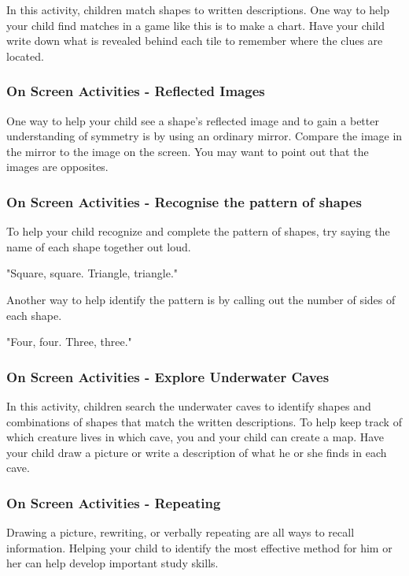 In this activity, children match shapes to written descriptions.
One way to help your child find matches in a game like this is to make a chart.
Have your child write down what is revealed behind each tile to remember where the clues are located.

\subsubsection{On Screen Activities - Reflected Images}

One way to help your child see a shape's reflected image and to gain a better understanding of symmetry is by using an ordinary mirror.
Compare the image in the mirror to the image on the screen.
You may want to point out that the images are opposites.

\subsubsection{On Screen Activities - Recognise the pattern of shapes}

To help your child recognize and complete the pattern of shapes, try saying the name of each shape together out loud.

"Square, square. Triangle, triangle."

Another way to help identify the pattern is by calling out the number of sides of each shape.

"Four, four. Three, three."

\subsubsection{On Screen Activities - Explore Underwater Caves}

In this activity, children search the underwater caves to identify shapes and combinations of shapes that match the written descriptions.
To help keep track of which creature lives in which cave, you and your child can create a map.
Have your child draw a picture or write a description of what he or she finds in each cave.

\subsubsection{On Screen Activities - Repeating}

Drawing a picture, rewriting, or verbally repeating are all ways to recall information.
Helping your child to identify the most effective method for him or her can help develop important study skills.

